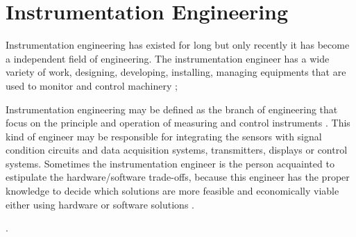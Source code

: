 \section{Instrumentation Engineering}	

	Instrumentation engineering has existed for long but only recently it has become a independent field of engineering. The instrumentation engineer has a wide variety of work, designing, developing, installing, managing equipments that are used to monitor and control machinery \cite{careerIndia};
	\par
	Instrumentation engineering may be defined as the branch of engineering that focus on the principle and operation of measuring and control instruments \cite{webster2014measurement}. This kind of engineer may be responsible for integrating the sensors with signal condition circuits and data acquisition systems, transmitters, displays or control systems. Sometimes the instrumentation engineer is the person acquainted to estipulate the hardware/software trade-offs, because this engineer has the proper knowledge to decide which solutions are more feasible and economically viable either using hardware or software solutions \cite{mandell1972hardware}.
	\par
	\cite{instrumentation-control-engineering-perfectionists}.

	
	
	
	
	
	
	
	

	
	
	
	
